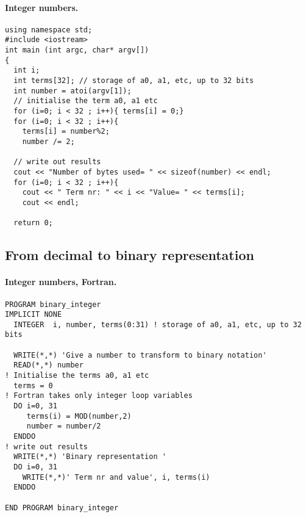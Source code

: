 \documentclass[%
oneside,                 %
final,                   %
10pt]{article}
\begin{document}
\paragraph{Integer numbers.}
\begin{verbatim}
using namespace std;
#include <iostream>
int main (int argc, char* argv[])
{
  int i;
  int terms[32]; // storage of a0, a1, etc, up to 32 bits
  int number = atoi(argv[1]);
  // initialise the term a0, a1 etc
  for (i=0; i < 32 ; i++){ terms[i] = 0;}
  for (i=0; i < 32 ; i++){
    terms[i] = number%2;
    number /= 2;

  // write out results
  cout << "Number of bytes used= " << sizeof(number) << endl;
  for (i=0; i < 32 ; i++){
    cout << " Term nr: " << i << "Value= " << terms[i];
    cout << endl;

  return 0;

\end{verbatim}



\subsection*{From decimal to binary representation}


\paragraph{Integer numbers, Fortran.}
\begin{verbatim}
PROGRAM binary_integer
IMPLICIT NONE
  INTEGER  i, number, terms(0:31) ! storage of a0, a1, etc, up to 32 bits

  WRITE(*,*) 'Give a number to transform to binary notation'
  READ(*,*) number
! Initialise the terms a0, a1 etc
  terms = 0
! Fortran takes only integer loop variables
  DO i=0, 31
     terms(i) = MOD(number,2)
     number = number/2
  ENDDO
! write out results
  WRITE(*,*) 'Binary representation '
  DO i=0, 31
    WRITE(*,*)' Term nr and value', i, terms(i)
  ENDDO

END PROGRAM binary_integer
\end{verbatim}
\end{document}
